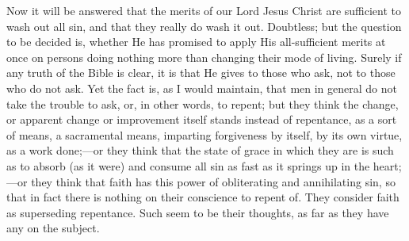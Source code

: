 Now it will be answered that the merits of our Lord Jesus Christ
are sufficient to wash out all sin, and that they really do wash it
out. Doubtless; but the question to be decided is, whether He has
promised to apply His all-sufficient merits at once on persons doing
nothing more than changing their mode of living. Surely if any truth
of the Bible is clear, it is that He gives to those who ask, not to
those who do not ask. Yet the fact is, as I would maintain, that men
in general do not take the trouble to ask, or, in other words, to
repent; but they think the change, or apparent change or improvement
itself stands instead of repentance, as a sort of means, a sacramental
means, imparting forgiveness by itself, by its own virtue, as a work
done;—or they think that the state of grace in which they are is
such as to absorb (as it were) and consume all sin as fast as it
springs up in the heart;—or they think that faith has this power of
obliterating and annihilating sin, so that in fact there is nothing on
their conscience to repent of. They consider faith as superseding
repentance. Such seem to be their thoughts, as far as they have any on
the subject.

